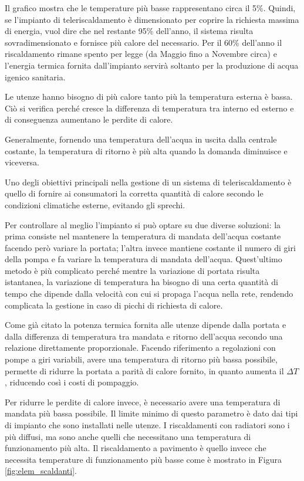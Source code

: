 \documentclass[laurea,oneside,11pt]{USiena_tesiLM}
\begin{document}
 Il grafico mostra che le temperature più basse rappresentano circa il 5\%. Quindi, se l'impianto di teleriscaldamento è dimensionato per coprire la richiesta massima di energia, vuol dire che nel restante 95\% dell'anno, il sistema risulta sovradimensionato e fornisce più calore del necessario.  Per il 60\% dell'anno il riscaldamento rimane spento per legge (da Maggio fino a Novembre circa) e l'energia termica fornita dall'impianto servirà soltanto per la produzione di acqua igenico sanitaria.

Le utenze hanno bisogno di più calore tanto più la temperatura esterna è bassa. Ciò si verifica perché cresce la differenza di temperatura tra interno ed esterno e di conseguenza aumentano le perdite di calore. 

Generalmente, fornendo una temperatura dell'acqua in uscita dalla centrale costante, la temperatura di ritorno è più alta quando la domanda diminuisce e viceversa.

Uno degli obiettivi principali nella gestione di un sistema di teleriscaldamento è quello  di fornire ai consumatori la corretta quantità di calore secondo le condizioni climatiche esterne,  evitando gli sprechi.

Per controllare al meglio l'impianto si può optare su due diverse soluzioni: la prima consiste nel mantenere la temperatura di mandata dell'acqua costante facendo però variare la portata; l'altra invece mantiene costante il numero di giri della pompa e fa variare la temperatura di mandata dell'acqua. Quest'ultimo metodo è più complicato perché mentre la variazione di portata risulta istantanea, la variazione di temperatura ha bisogno di una certa quantità di tempo  che dipende dalla velocità con cui si propaga l'acqua nella rete, rendendo complicata la gestione in caso di picchi di richiesta di calore. 

Come già citato la potenza termica fornita alle utenze dipende dalla portata e dalla differenza di temperatura tra mandata e ritorno dell'acqua secondo una relazione direttamente proporzionale. Facendo riferimento a regolazioni con pompe a giri variabili, avere una temperatura di ritorno più bassa possibile, permette di ridurre la portata a parità di calore fornito, in quanto aumenta il $\Delta T$, riducendo così i costi di pompaggio.

Per ridurre le perdite di calore invece, è necessario avere una temperatura di mandata più bassa possibile. Il limite minimo di questo parametro è dato dai tipi di impianto che sono installati nelle utenze. I riscaldamenti con radiatori sono i più diffusi, ma sono anche quelli che necessitano una temperatura di funzionamento più alta. Il riscaldamento a pavimento è quello invece che necessita temperature di funzionamento più basse come è mostrato in Figura \ref{fig:elem_scaldanti}. 
\end{document}
